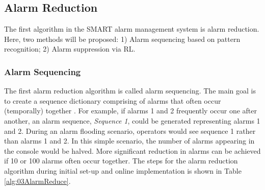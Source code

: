 \subsection{Alarm Reduction}
The first algorithm in the SMART alarm management system is alarm reduction. Here, two methods will be proposed: 1) Alarm sequencing based on pattern recognition; 2) Alarm suppression via RL.

\subsubsection{Alarm Sequencing}
The first alarm reduction algorithm is called alarm sequencing.  The main goal is to create a sequence dictionary comprising of alarms that often occur (temporally) together \cite{alarm_sequence}.  For example, if alarms 1 and 2 frequently occur one after another, an alarm sequence, \emph{Sequence 1}, could be generated representing alarms 1 and 2. During an alarm flooding scenario, operators would see sequence 1 rather than alarms 1 and 2. In this simple scenario, the number of alarms appearing in the console would be halved.  More significant reduction in alarms can be achieved if 10 or 100 alarms often occur together.  The steps for the alarm reduction algorithm during initial set-up and online implementation is shown in Table \ref{alg:03AlarmReduce}.

